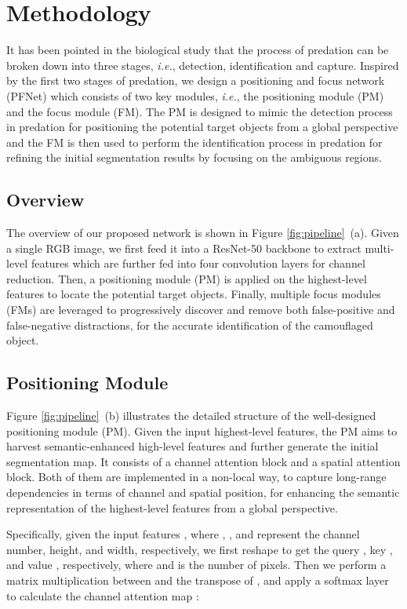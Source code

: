 \documentclass[final]{cvpr}
\begin{document}
\section{Methodology}
It has been pointed in the biological study \cite{hall2013camouflage} that the process of predation can be broken down into three stages, \emph{i.e.}, detection, identification and capture.
Inspired by the first two stages of predation, we design a positioning and focus network (PFNet) which consists of two key modules, \emph{i.e.}, the positioning module (PM) and the focus module (FM).
The PM is designed to mimic the detection process in predation for positioning the potential target objects from a global perspective and the FM is then used to perform the identification process in predation for refining the initial segmentation results by focusing on the ambiguous regions.

\subsection{Overview}
The overview of our proposed network is shown in Figure \ref{fig:pipeline}~(a). Given a single RGB image, we first feed it into a ResNet-50 \cite{he2016deep_resnet} backbone to extract multi-level features which are further fed into four convolution layers for channel reduction. Then, a positioning module (PM) is applied on the highest-level features to locate the potential target objects. Finally, multiple focus modules (FMs) are leveraged to progressively discover and remove both false-positive and false-negative distractions, for the accurate identification of the camouflaged object.

\subsection{Positioning Module}
Figure \ref{fig:pipeline}~(b) illustrates the detailed structure of the well-designed positioning module (PM). Given the input highest-level features, the PM aims to harvest semantic-enhanced high-level features and further generate the initial segmentation map. It consists of a channel attention block and a spatial attention block. Both of them are implemented in a non-local way, to capture long-range dependencies in terms of channel and spatial position, for enhancing the semantic representation of the highest-level features from a global perspective.

Specifically, given the input features , where , , and  represent the channel number, height, and width, respectively, we first reshape  to get the query , key , and value , respectively, where  and  is the number of pixels. Then we perform a matrix multiplication between  and the transpose of , and apply a softmax layer to calculate the channel attention map :
\end{document}
